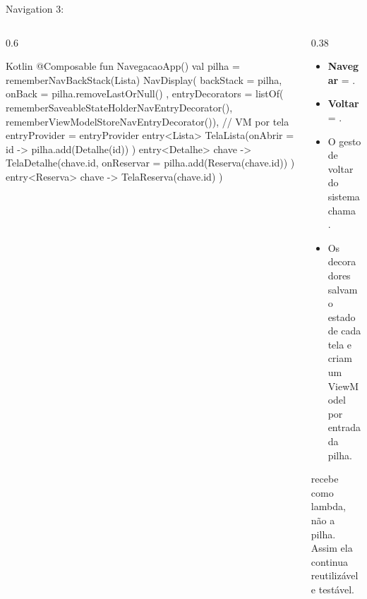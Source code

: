 \documentclass[aspectratio=169,10pt]{beamer}
\begin{document}
\begin{frame}[fragile]{Navigation 3: }
  \begin{columns}[T]
    \begin{column}{0.6\textwidth}
\begin{codigo}[title=NavegacaoApp.kt]{Kotlin}
@Composable
fun NavegacaoApp() {
  val pilha = rememberNavBackStack(Lista)
  NavDisplay(
    backStack = pilha,
    onBack = { pilha.removeLastOrNull() },
    entryDecorators = listOf(
      rememberSaveableStateHolderNavEntryDecorator(),
      rememberViewModelStoreNavEntryDecorator()), // VM por tela
    entryProvider = entryProvider {
      entry<Lista> {
        TelaLista(onAbrir = { id -> pilha.add(Detalhe(id)) })
      }
      entry<Detalhe> { chave ->
        TelaDetalhe(chave.id,
          onReservar = { pilha.add(Reserva(chave.id)) })
      }
      entry<Reserva> { chave -> TelaReserva(chave.id) }
    }
  )
}
\end{codigo}
    \end{column}
    \begin{column}{0.38\textwidth}
      \small
      \begin{itemize}
        \item \textbf{Navegar} = .
        \item \textbf{Voltar} = .
        \item O gesto de voltar do sistema chama .
        \item Os decoradores salvam o estado de cada tela e criam um ViewModel por entrada da pilha.
      \end{itemize}
      \begin{atencao}
         recebe  como lambda, não a pilha. Assim ela continua reutilizável e testável.
      \end{atencao}
    \end{column}
  \end{columns}
\end{frame}
\end{document}
